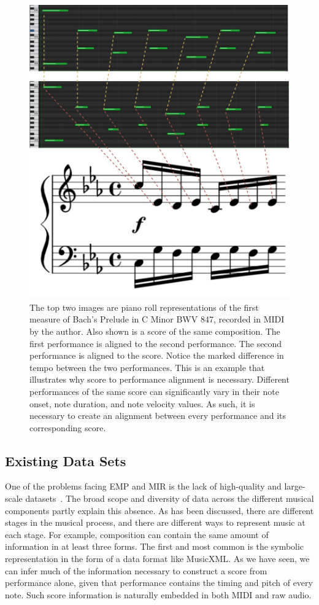 \begin{figure}
    \centering
    \includegraphics[width=0.85\linewidth]{figs/ch2/score_2_perf_alignment.jpg}
    \caption{The top two images are piano roll representations of the first measure of Bach's Prelude in C Minor BWV 847, recorded in MIDI by the author. Also shown is a score of the same composition. The first performance is aligned to the second performance. The second performance is aligned to the score. Notice the marked difference in tempo between the two performances. This is an example that illustrates why score to performance alignment is necessary. Different performances of the same score can significantly vary in their note onset, note duration, and note velocity values. As such, it is necessary to create an alignment between every performance and its corresponding score.}
    \label{fig:alignment}
\end{figure}

\subsection{Existing Data Sets}
One of the problems facing EMP and MIR is the lack of high-quality and large-scale datasets~\cite{cancino2018computational}. The broad scope and diversity of data across the different musical components partly explain this absence. As has been discussed, there are different stages in the musical process, and there are different ways to represent music at each stage. For example, composition can contain the same amount of information in at least three forms. The first and most common is the symbolic representation in the form of a data format like MusicXML. As we have seen, we can infer much of the information necessary to construct a score from performance alone, given that performance contains the timing and pitch of every note. Such score information is naturally embedded in both MIDI and raw audio. 

